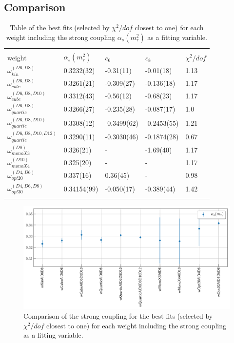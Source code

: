 \documentclass[../../index.tex]{subfiles}
\begin{document}
\newpage
\subsection{Comparison}
\begin{table}[H]
  \centering
  \begin{tabular}{lllll}
    \toprule \\
    weight & $\alpha_s(m_\tau^2)$ & $c_6$ & $c_8$ & $\chi^2/dof$  \\
    $\omega_{kin}^{(D6,D8)}$ & 0.3232(32) & -0.31(11) & -0.01(18) & 1.13 \\
    $\omega_{cube}^{(D6,D8)}$ & 0.3261(21) & -0.309(27) & -0.136(18) & 1.17 \\
    $\omega_{cube}^{(D6,D8,D10)}$ & 0.3312(43) & -0.56(12) & -0.68(23) & 1.17 \\
    $\omega_{quartic}^{(D6,D8)}$ & 0.3266(27) & -0.235(28) & -0.087(17) & 1.0 \\
    $\omega_{quartic}^{(D6,D8,D10)}$ & 0.3308(12) & -0.3499(62) & -0.2453(55) & 1.21 \\
    $\omega_{quartic}^{(D6,D8,D10,D12)}$ & 0.3290(11)  & -0.3030(46) & -0.1874(28) & 0.67 \\
    $\omega_{monoX3}^{(D8)}$ & 0.326(21) & - & -1.69(40) & 1.17 \\
    $\omega_{monoX4}^{(D10)}$ & 0.325(20) & - & - & 1.17 \\
    $\omega_{opt20}^{(D4,D6)}$ & 0.337(16) & 0.36(45) & - & 0.98 \\
    $\omega_{opt30}^{(D4,D6,D8)}$ & 0.34154(99) & -0.050(17) & -0.389(44) & 1.42 \\
    \hline \\
    \bottomrule
  \end{tabular}
  \caption{Table of the best fits (selected by $\chi^2/dof$ closest to one) for
    each weight including the strong coupling $\alpha_s(m_\tau^2)$ as a fitting variable.}
  \label{table:fitCombinations}
\end{table}
\begin{figure}[H]
  \includegraphics[width=\textwidth]{./images/comparisonAlpha.png}
  \caption{Comparison of the strong coupling for the best fits (selected by
    $\chi^2/dof$ closest to one) for each weight including the strong coupling
    as a fitting variable.}
\end{figure}
\end{document}
